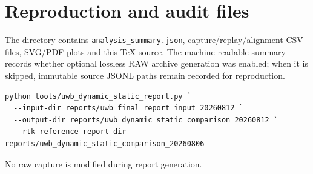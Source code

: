 \documentclass[10pt,a4paper]{article}
\begin{document}
\section{Reproduction and audit files}
The directory contains \texttt{analysis\_summary.json}, capture/replay/alignment
CSV files, SVG/PDF plots and this TeX source. The machine-readable summary
records whether optional lossless RAW archive generation was enabled; when it
is skipped, immutable source JSONL paths remain recorded for reproduction.

\begin{verbatim}
python tools/uwb_dynamic_static_report.py `
  --input-dir reports/uwb_final_report_input_20260812 `
  --output-dir reports/uwb_dynamic_static_comparison_20260812 `
  --rtk-reference-report-dir reports/uwb_dynamic_static_comparison_20260806
\end{verbatim}

No raw capture is modified during report generation.
\end{document}
